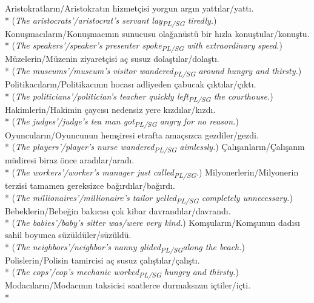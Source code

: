 \ex Aristokratlar{\i}n/Aristokrat{\i}n hizmet\c{c}isi yorgun arg{\i}n yatt{\i}lar/yatt{\i}.\\*
({\it The aristocrats'/aristocrat's servant lay\textsubscript{PL/SG} tiredly.})
\ex Konu\c{s}mac{\i}lar{\i}n/Konu\c{s}mac{\i}n{\i}n sunucusu ola\u{g}an\"{u}st\"{u} bir h{\i}zla konu\c{s}tular/konu\c{s}tu.\\*
({\it The speakers'/speaker's presenter spoke\textsubscript{PL/SG} with extraordinary speed.})
\ex M\"{u}zelerin/M\"{u}zenin ziyaret\c{c}isi a\c{c} susuz dola\c{s}t{\i}lar/dola\c{s}t{\i}.\\*
({\it The museums'/museum's visitor wandered\textsubscript{PL/SG} around hungry and thirsty.})
\ex Politikac{\i}lar{\i}n/Politikac{\i}n{\i}n hocas{\i} adliyeden \c{c}abucak \c{c}{\i}kt{\i}lar/\c{c}{\i}kt{\i}.\\*
({\it The politicians'/politician's teacher quickly left\textsubscript{PL/SG} the courthouse.})
\ex Hakimlerin/Hakimin \c{c}ayc{\i}s{\i} nedensiz yere k{\i}zd{\i}lar/k{\i}zd{\i}.\\*
({\it The judges'/judge's tea man got\textsubscript{PL/SG} angry for no reason.})
\ex Oyuncular{\i}n/Oyuncunun hem\c{s}iresi etrafta ama\c{c}s{\i}zca gezdiler/gezdi.\\*
({\it The players'/player's nurse wandered\textsubscript{PL/SG} aimlessly.})
\ex \c{C}al{\i}\c{s}anlar{\i}n/\c{C}al{\i}\c{s}an{\i}n m\"{u}diresi biraz \"{o}nce arad{\i}lar/arad{\i}.\\*
({\it The workers'/worker's manager just called\textsubscript{PL/SG}.})
\ex Milyonerlerin/Milyonerin terzisi tamamen gereksizce ba\u{g}{\i}rd{\i}lar/ba\u{g}{\i}rd{\i}.\\*
({\it The millionaires'/millionaire's tailor yelled\textsubscript{PL/SG} completely unnecessary.})
\ex Bebeklerin/Bebe\u{g}in bak{\i}c{\i}s{\i} \c{c}ok kibar davrand{\i}lar/davrand{\i}.\\*
({\it The babies'/baby's sitter was/were very kind.})
\ex Kom\c{s}ular{\i}n/Kom\c{s}unun dad{\i}s{\i} sahil boyunca s\"{u}z\"{u}ld\"{u}ler/s\"{u}z\"{u}ld\"{u}.\\*
({\it The neighbors'/neighbor's nanny glided\textsubscript{PL/SG}along the beach.})
\ex Polislerin/Polisin tamircisi a\c{c} susuz \c{c}al{\i}\c{s}t{\i}lar/\c{c}al{\i}\c{s}t{\i}.\\*
({\it The cops'/cop's mechanic worked\textsubscript{PL/SG} hungry and thirsty.})
\ex Modac{\i}lar{\i}n/Modac{\i}n{\i}n taksicisi saatlerce durmaks{\i}z{\i}n i\c{c}tiler/i\c{c}ti.\\*
